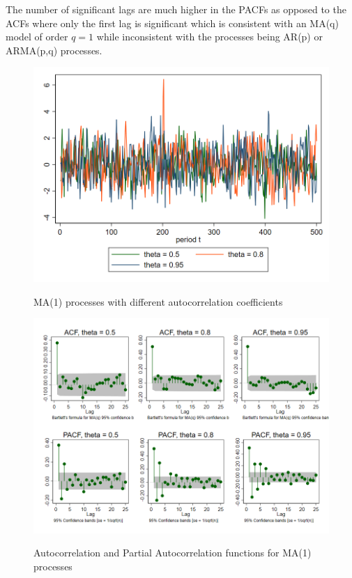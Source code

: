 The number of significant lags are much higher in the PACFs as opposed to the ACFs where only the first lag is significant which is consistent with an MA(q) model of order $q=1$ while inconsistent with the processes being AR(p) or ARMA(p,q) processes.
\begin{figure}[H]
  \caption{MA(1) processes with different autocorrelation coefficients}
  \includegraphics[width= \textwidth]{03_figures/fig22c}
  \label{fig:ma1}
  \vspace{-0.1cm}
\end{figure}
\begin{figure}[H]
  \vspace{-1cm}
  \caption{Autocorrelation and Partial Autocorrelation functions for MA(1) processes}
  \includegraphics[width= \textwidth]{03_figures/fig22c_ac}
  \label{fig:ma1_acf}
  \vspace{-1cm}
\end{figure}
